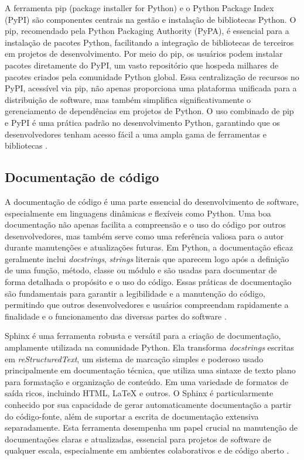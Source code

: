 A ferramenta pip (package installer for Python) e o Python Package Index (PyPI) são componentes centrais na gestão e instalação de bibliotecas {Python}.
O pip, recomendado pela {Python} Packaging Authority (PyPA), é essencial para a instalação de pacotes {Python},
facilitando a integração de bibliotecas de terceiros em projetos de desenvolvimento.
Por meio do pip, os usuários podem instalar pacotes diretamente do PyPI, um vasto repositório que hospeda milhares de
pacotes criados pela comunidade {Python} global.
Essa centralização de recursos no PyPI, acessível via pip, não apenas proporciona uma plataforma unificada para a
distribuição de software, mas também simplifica significativamente o gerenciamento de dependências em projetos de
{Python}.
O uso combinado de pip e PyPI é uma prática padrão no desenvolvimento Python, garantindo que os desenvolvedores tenham
acesso fácil a uma ampla gama de ferramentas e bibliotecas \cite{pip}.

\subsection{Documentação de código}

A documentação de código é uma parte essencial do desenvolvimento de software, especialmente em linguagens dinâmicas e
flexíveis como Python.
Uma boa documentação não apenas facilita a compreensão e o uso do código por outros desenvolvedores, mas também serve
como uma referência valiosa para o autor durante manutenções e atualizações futuras.
Em Python, a documentação eficaz geralmente inclui \textit{docstrings}, \textit{strings} literais que aparecem logo após
a definição de uma função, método, classe ou módulo e são usadas para documentar de forma detalhada o propósito e o uso
do código.
Essas práticas de documentação são fundamentais para garantir a legibilidade e a manutenção do código, permitindo que
outros desenvolvedores e usuários compreendam rapidamente a finalidade e o funcionamento das diversas partes do software
\cite{pydocs}.

Sphinx é uma ferramenta robusta e versátil para a criação de documentação, amplamente utilizada na comunidade Python.
Ela transforma \textit{docstrings} escritas em \textit{reStructuredText}, um sistema de marcação simples e poderoso
usado principalmente em documentação técnica, que utiliza uma sintaxe de texto plano para formatação e organização de
conteúdo.
Em uma variedade de formatos de saída ricos, incluindo HTML, LaTeX e outros.
O Sphinx é particularmente conhecido por sua capacidade de gerar automaticamente documentação a partir do código-fonte,
além de suportar a escrita de documentação extensiva separadamente.
Esta ferramenta desempenha um papel crucial na manutenção de documentações claras e atualizadas, essencial para projetos
de software de qualquer escala, especialmente em ambientes colaborativos e de código aberto \cite{sphinx}.

